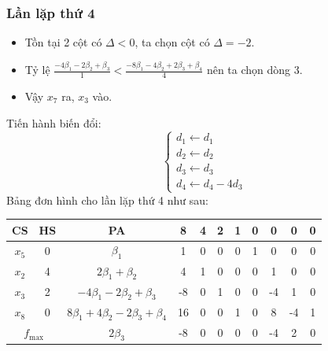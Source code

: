 \documentclass[12pt]{article}
\begin{document}
\subsubsection{Lần lặp thứ 4}
\begin{itemize}
\item Tồn tại 2 cột có $\Delta < 0$, ta chọn cột có $\Delta = -2$.
\item Tỷ lệ $\displaystyle \frac{-4\beta_1 - 2\beta_2 + \beta_3}{1} < \frac{-8\beta_1 - 4\beta_2 + 2\beta_3 + \beta_4}{4}$ nên ta chọn dòng 3.
\item Vậy $x_7$ ra, $x_3$ vào.
\end{itemize}
Tiến hành biến đổi:
$$
\left\{
\begin{array}{lll}
d_1 \leftarrow d_1 \\
d_2 \leftarrow d_2 \\
d_3 \leftarrow d_3\\
d_4 \leftarrow d_4 - 4d_3
\end{array}
\right.
$$
Bảng đơn hình cho lần lặp thứ 4 như sau:
\begin{table}[H]
\centering
\begin{tabular}{|c|c|c|c|c|c|c|c|c|c|c|}
\hline
CS & HS & PA & 8 & 4 & 2 & 1 & 0 & 0 & 0 & 0 \\
\hline
$x_5$ & 0 & $\beta_1$ & 1 & 0 & 0 & 0 & 1 & 0 & 0 & 0 \\
$x_2$ & 4 & $2\beta_1 + \beta_2$ & 4 & 1 & 0 & 0 & 0 & 1 & 0 & 0 \\
$x_3$ & 2 & $-4\beta_1 - 2\beta_2 + \beta_3$ & -8 & 0 & 1 & 0 & 0 & -4 & 1 & 0 \\
$x_8$ & 0 & $8\beta_1 + 4\beta_2 - 2\beta_3 + \beta_4$ & 16 & 0 & 0 & 1 & 0 & 8 & -4 & 1 \\
\hline
\multicolumn{2}{|c|}{$f_{\max}$}
& $2\beta_3$ & -8 & 0 & 0 & 0 & 0 & -4 & 2 & 0 \\
\hline
\end{tabular}
\end{table}
\end{document}
